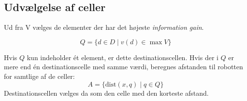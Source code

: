 \subsection{Udvælgelse af celler }
Ud fra V vælges de elementer der har det højeste \textit{information gain}. 


\begin{equation}
Q = \{ d \in D \mid v(d) \in \max V \}
\end{equation}

Hvis $ Q $ kun indeholder ét element, er dette destinationscellen. 
Hvis der i $Q$ er mere end én destinationscelle med samme værdi, beregnes afstanden til robotten for samtlige af de celler:
\begin{equation}
A = \{ \text{dist}(x,q) \mid q \in Q \}
\end{equation}
Destinationscellen vælges da som den celle med den korteste afstand.
